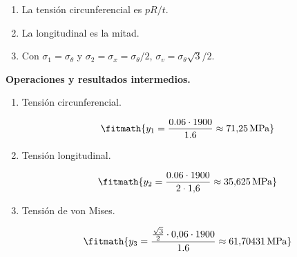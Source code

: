 \begin{enumerate}

\item La tensión circunferencial es $pR/t$.

\item La longitudinal es la mitad.

\item Con $\sigma_1 = \sigma_\theta$ y $\sigma_2 = \sigma_x = \sigma_\theta/2$, $\sigma_v = \sigma_\theta\sqrt{3}/2$.

\end{enumerate}

\noindent\textbf{Operaciones y resultados intermedios.}

\begin{enumerate}

\item Tensión circunferencial.

\[\fitmath{y_{1}=\frac{0.06\cdot 1900}{1.6}\approx 71{,}25\,\mathrm{MPa}}\]

\item Tensión longitudinal.

\[\fitmath{y_{2}=\frac{0.06\cdot 1900}{2\cdot 1{,}6}\approx 35{,}625\,\mathrm{MPa}}\]

\item Tensión de von Mises.

\[\fitmath{y_{3}=\frac{\frac{\sqrt{3}}{2}\cdot 0{,}06\cdot 1900}{1.6}\approx 61{,}70431\,\mathrm{MPa}}\]

\end{enumerate}
